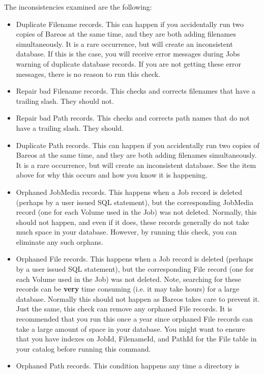 The inconsistencies examined are the following:

\begin{itemize}
\item Duplicate Filename records. This can happen if you accidentally run  two
   copies of Bareos at the same time, and they are both adding  filenames
   simultaneously. It is a rare occurrence, but will create  an inconsistent
   database. If this is the case, you will receive  error messages during Jobs
   warning of duplicate database records.  If you are not getting these error
   messages, there is no reason  to run this check.
\item Repair bad Filename records. This checks and corrects filenames  that
   have a trailing slash. They should not.
\item Repair bad Path records. This checks and corrects path names  that do
   not have a trailing slash. They should.
\item Duplicate Path records. This can happen if you accidentally run  two
   copies of Bareos at the same time, and they are both adding  filenames
   simultaneously. It is a rare occurrence, but will create  an inconsistent
   database. See the item above for why this occurs and  how you know it is
   happening.
\item Orphaned JobMedia records. This happens when a Job record is deleted
   (perhaps by a user issued SQL statement), but the corresponding  JobMedia
   record (one for each Volume used in the Job) was not deleted.  Normally, this
   should not happen, and even if it does, these records  generally do not take
   much space in your database. However, by running  this check, you can
   eliminate any such orphans.
\item Orphaned File records. This happens when a Job record is deleted
   (perhaps by a user issued SQL statement), but the corresponding  File record
   (one for each Volume used in the Job) was not deleted.  Note, searching for
   these records can be {\bf very} time consuming (i.e.  it may take hours) for a
   large database. Normally this should not  happen as Bareos takes care to
   prevent it. Just the same, this  check can remove any orphaned File records.
   It is recommended that  you run this once a year since orphaned File records
   can take a  large amount of space in your database. You might
   want to ensure that you have indexes on JobId, FilenameId, and
   PathId for the File table in your catalog before running this
   command.
\item Orphaned Path records. This condition happens any time a directory is

\end{itemize}
